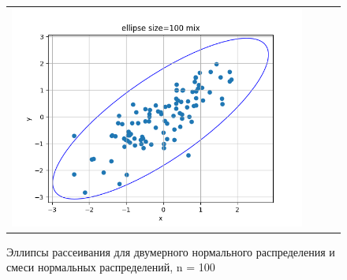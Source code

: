 \begin{figure}[H]
\begin{tabular}{cccc}
		\includegraphics[scale=0.3]{ellipse_100_mix.png}
	\end{tabular}
	\caption{Эллипсы рассеивания для двумерного нормального распределения и смеси нормальных распределений, n = 100}
\end{figure}
